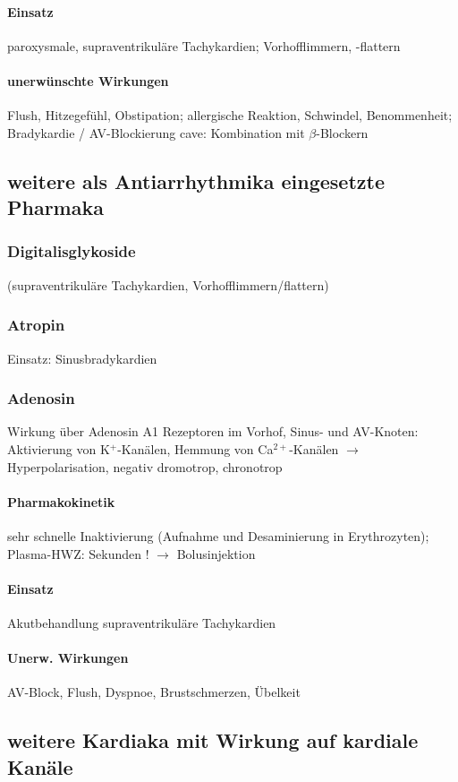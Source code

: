 \documentclass[10pt,a4paper]{report}
\begin{document}
\paragraph{Einsatz}  paroxysmale, supraventrikuläre Tachykardien; Vorhofflimmern, -flattern

\paragraph{unerwünschte Wirkungen}Flush, Hitzegefühl, Obstipation; allergische Reaktion, Schwindel, Benommenheit; Bradykardie / AV-Blockierung cave: Kombination mit $\beta$-Blockern

\subsection{weitere als Antiarrhythmika eingesetzte Pharmaka}
\subsubsection{Digitalisglykoside}  (supraventrikuläre Tachykardien, Vorhofflimmern/flattern)
\subsubsection{Atropin}  Einsatz: Sinusbradykardien
\subsubsection{Adenosin}  Wirkung über Adenosin A1 Rezeptoren im Vorhof, Sinus- und AV-Knoten: Aktivierung von K$^+$-Kanälen, Hemmung von Ca$^{2+}$-Kanälen $\rightarrow$ Hyperpolarisation, negativ dromotrop, chronotrop
\paragraph{Pharmakokinetik} sehr schnelle Inaktivierung (Aufnahme und Desaminierung in Erythrozyten); Plasma-HWZ: Sekunden ! $\rightarrow$ Bolusinjektion
\paragraph{Einsatz} Akutbehandlung supraventrikuläre Tachykardien
\paragraph{Unerw. Wirkungen} AV-Block, Flush, Dyspnoe, Brustschmerzen, Übelkeit

\subsection{weitere Kardiaka mit Wirkung auf kardiale Kanäle}
\end{document}
